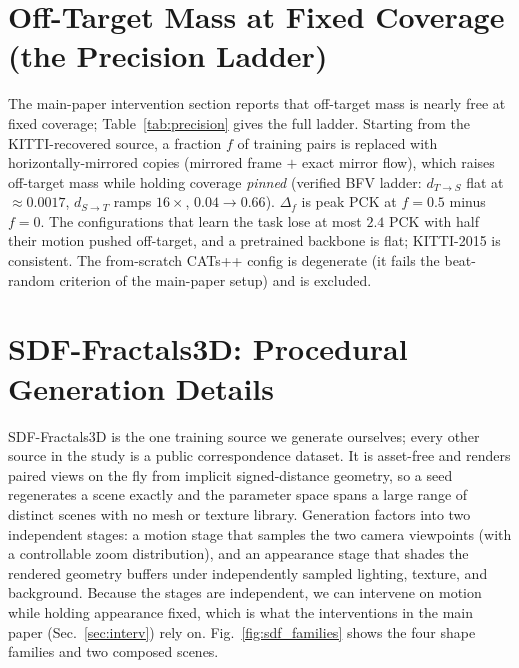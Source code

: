 \documentclass[runningheads]{llncs}
\newcommand{\dtb}{d_{S\to T}}
\newcommand{\dbt}{d_{T\to S}}
\newcommand{\pck}{PCK}
\begin{document}
\section{Off-Target Mass at Fixed Coverage (the Precision Ladder)}
\label{supp:precision}
The main-paper intervention section reports that off-target mass is nearly free at
fixed coverage; Table~\ref{tab:precision} gives the full ladder. Starting from the
KITTI-recovered source, a fraction $f$ of training pairs is replaced with
horizontally-mirrored copies (mirrored frame $+$ exact mirror flow), which raises
off-target mass while holding coverage \emph{pinned} (verified BFV ladder:
$\dbt$ flat at ${\approx}0.0017$, $\dtb$ ramps $16\times$,
$0.04{\to}0.66$). $\Delta_f$ is peak \pck{} at $f{=}0.5$ minus $f{=}0$. The
configurations that learn the task lose at most $2.4$ \pck{} with half their motion
pushed off-target, and a pretrained backbone is flat; KITTI-2015 is consistent. The
from-scratch CATs++ config is degenerate (it fails the beat-random criterion of the
main-paper setup) and is excluded.

\begin{table}[h]
\centering
\caption{Off-target mass at fixed coverage. Peak \pck{} on KITTI-2012 across the
mirror-flip off-target ladder; coverage pinned (see text).}
\label{tab:precision}
\small
\setlength{\tabcolsep}{5pt}

\end{table}

\section{SDF-Fractals3D: Procedural Generation Details}
\label{supp:sdf}

SDF-Fractals3D is the one training source we generate ourselves; every other source
in the study is a public correspondence dataset. It is asset-free and renders paired
views on the fly from implicit signed-distance geometry, so a seed regenerates a
scene exactly and the parameter space spans a large range of distinct scenes with no
mesh or texture library. Generation factors into two independent stages: a motion
stage that samples the two camera viewpoints (with a controllable zoom distribution),
and an appearance stage that shades the rendered geometry buffers under independently
sampled lighting, texture, and background. Because the stages are independent, we can
intervene on motion while holding appearance fixed, which is what the interventions
in the main paper (Sec.~\ref{sec:interv}) rely on. Fig.~\ref{fig:sdf_families} shows
the four shape families and two composed scenes.
\end{document}
